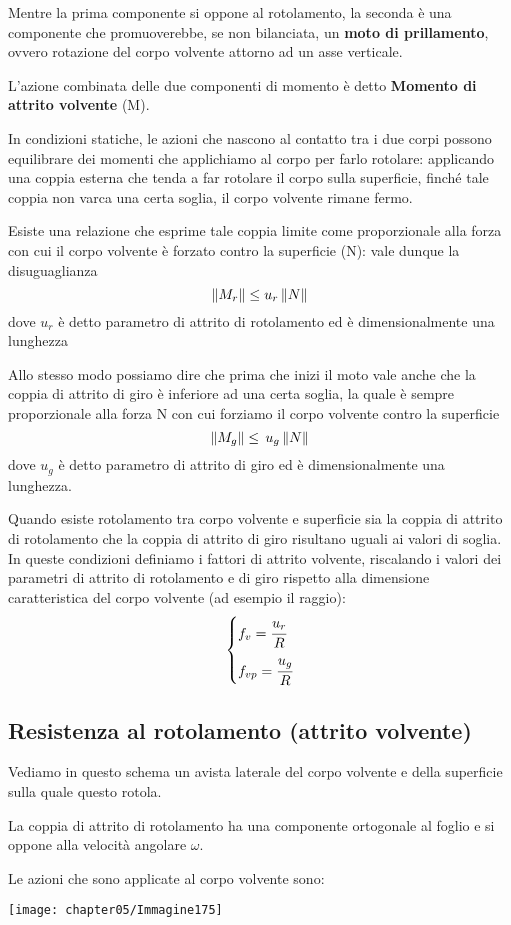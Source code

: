 Mentre la prima componente si oppone al rotolamento, la seconda è una componente che promuoverebbe, se non bilanciata, un \textbf{moto di prillamento}, ovvero rotazione del corpo volvente attorno ad un asse verticale.

L'azione combinata delle due componenti di momento è detto \textbf{Momento di attrito volvente} (M).

In condizioni statiche, le azioni che nascono al contatto tra i due corpi possono equilibrare dei momenti che applichiamo al corpo per farlo rotolare: applicando una coppia esterna che tenda a far rotolare il corpo sulla superficie, finché tale coppia non varca una certa soglia, il corpo volvente rimane fermo.

Esiste una relazione che esprime tale coppia limite come proporzionale alla forza con cui il corpo volvente è forzato contro la superficie (N): vale dunque la disuguaglianza
\[\lVert M_r\rVert \le u_r\,\lVert N\rVert\]
dove $u_r$ è detto parametro di attrito di rotolamento ed è dimensionalmente una lunghezza

Allo stesso modo possiamo dire che prima che inizi il moto vale anche che la coppia di attrito di giro è inferiore ad una certa soglia, la quale è sempre proporzionale alla forza N con cui forziamo il corpo volvente contro la superficie
\[\lVert M_g\rVert \le\,u_g\,\lVert N\rVert\]
dove $u_g$ è detto parametro di attrito di giro ed è dimensionalmente una lunghezza.

Quando esiste rotolamento tra corpo volvente e superficie sia la coppia di attrito di rotolamento che la coppia di attrito di giro risultano uguali ai valori di soglia. In queste condizioni definiamo i fattori di attrito volvente, riscalando i valori dei parametri di attrito di rotolamento e di giro rispetto alla dimensione caratteristica del corpo volvente (ad esempio il raggio):
\[
\begin{dcases}
f_v = \cfrac{u_r}{R}\\
f_{vp} = \cfrac{u_g}{R}
\end{dcases}
\]

\subsection{Resistenza al rotolamento (attrito volvente)}

\begin{minipage}{.65\textwidth}
Vediamo in questo schema un avista laterale del corpo volvente e della superficie sulla quale questo rotola.\newline

 La coppia di attrito di rotolamento ha una componente ortogonale al foglio e si oppone alla velocità angolare $\omega$.

Le azioni che sono applicate al corpo volvente sono:
\end{minipage}
\hfill
\begin{minipage}{.35\textwidth}
\centering
\texttt{[image: chapter05/Immagine175]}
\end{minipage}

